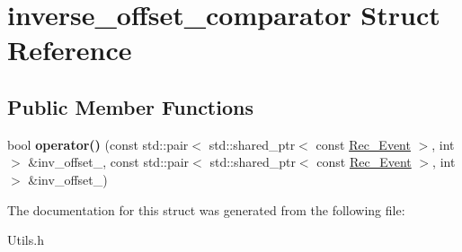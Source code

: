 \hypertarget{structinverse__offset__comparator}{}\section{inverse\+\_\+offset\+\_\+comparator Struct Reference}
\label{structinverse__offset__comparator}
\subsection*{Public Member Functions}
\begin{DoxyCompactItemize}
\item 
\mbox{\label{structinverse__offset__comparator_afa8f3857c10adb3cd7f7cdb4b0cedc64}} 
bool {\bfseries operator()} (const std\+::pair$<$ std\+::shared\+\_\+ptr$<$ const \hyperlink{classRec__Event}{Rec\+\_\+\+Event} $>$, int $>$ \&inv\+\_\+offset\+\_, const std\+::pair$<$ std\+::shared\+\_\+ptr$<$ const \hyperlink{classRec__Event}{Rec\+\_\+\+Event} $>$, int $>$ \&inv\+\_\+offset\+\_)
\end{DoxyCompactItemize}


The documentation for this struct was generated from the following file\+:\begin{DoxyCompactItemize}
\item 
Utils.\+h\end{DoxyCompactItemize}
